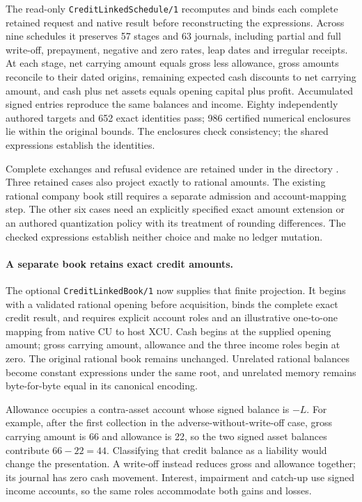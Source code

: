The read-only \texttt{CreditLinkedSchedule/1} recomputes and binds each complete
retained request and native result before reconstructing the expressions.
Across nine schedules it preserves 57 stages and 63 journals, including
partial and full write-off, prepayment, negative and zero rates, leap dates
and irregular receipts. At each stage, net carrying amount equals gross less
allowance, gross amounts reconcile to their dated origins, remaining expected
cash discounts to net carrying amount, and cash plus net assets equals opening
capital plus profit. Accumulated signed entries reproduce the same balances
and income. Eighty independently authored targets and 652 exact identities
pass; 986 certified numerical enclosures lie within the original bounds. The
enclosures check consistency; the shared expressions establish the identities.

Complete exchanges and refusal evidence are retained under
{\small{}} in the directory
{\small{}}. Three
retained cases also project exactly to rational amounts. The existing rational
company book still requires a separate admission and account-mapping step.
The other six cases need an explicitly specified exact amount extension or
an authored quantization policy with its treatment of rounding differences.
The checked expressions establish neither choice and make no ledger mutation.


\paragraph{A separate book retains exact credit amounts.}
The optional \texttt{CreditLinkedBook/1} now supplies that finite projection.
It begins with a validated rational opening before acquisition, binds the
complete exact credit result, and requires explicit account roles and an
illustrative one-to-one mapping from native CU to host XCU. Cash begins at
the supplied opening amount; gross carrying amount, allowance and the three
income roles begin at zero. The original rational book remains unchanged.
Unrelated rational balances become constant expressions under the same root,
and unrelated memory remains byte-for-byte equal in its canonical encoding.

Allowance occupies a contra-asset account whose signed balance is $-L$.
For example, after the first collection in the adverse-without-write-off case,
gross carrying amount is 66 and allowance is 22, so the two signed asset
balances contribute $66-22=44$. Classifying that credit balance as a liability
would change the presentation. A write-off instead reduces gross and allowance
together; its journal has zero cash movement. Interest, impairment and catch-up
use signed income accounts, so the same roles accommodate both gains and losses.

